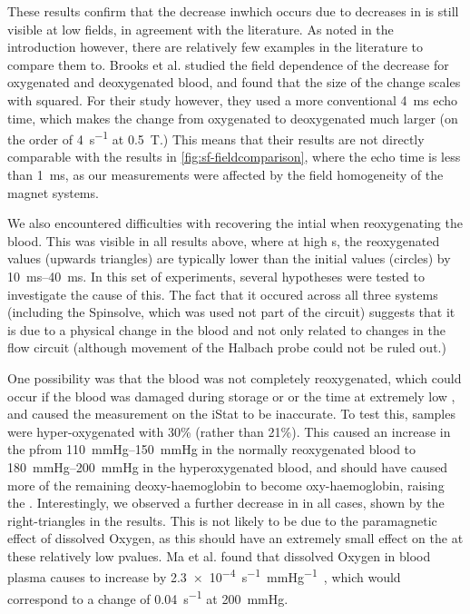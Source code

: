 These results confirm that the decrease in\Ttwo which occurs due to decreases in \SOtwo is still visible at low fields, in agreement with the literature.
As noted in the introduction however, there are relatively few examples in the literature to compare them to.
Brooks et al. studied the field dependence of the \Ttwo decrease for oxygenated and deoxygenated blood, and found that the size of the \Rtwo change scales with \Bzero  squared\cite[Fig.1]{BrooksComparisont2relaxation1995}.
For their study however, they used a more conventional \SI{4}{ms} echo time, which makes the \Rtwo change from oxygenated to deoxygenated much larger (on the order of \SI{4}{s^{-1}} at \SI{0.5}{T}.)
This means that their results are not directly comparable with the results in \autoref{fig:sf-fieldcomparison}, where the echo time is less than \SI{1}{ms}, as our measurements were affected by the field homogeneity of the magnet systems.

We also encountered difficulties with recovering the intial \Ttwo when reoxygenating the blood.
This was visible in all results above, where at high \SOtwo{}s, the reoxygenated \Ttwo values (upwards triangles)  are typically lower than the initial values (circles) by \SIrange{10}{40}{ms}.
In this set of experiments, several hypotheses were tested to investigate the cause of this.
The fact that it occured across all three systems (including the Spinsolve, which was used not part of the circuit) suggests that it is due to a physical change in the blood and not only related to changes in the flow circuit (although movement of the Halbach probe could not be ruled out.)

One possibility was that the blood was not completely reoxygenated, which could occur if the blood was damaged during storage or or the time at extremely low \SOtwo, and caused the \SOtwo measurement on the iStat to be inaccurate.
To test this, samples were hyper-oxygenated with 30\% \Otwo (rather than 21\%).
This caused an increase in the p\Otwo from \SIrange{110}{150}{mmHg} in the normally reoxygenated blood to \SIrange{180}{200}{mmHg} in the hyperoxygenated blood, and should have caused more of the remaining deoxy-haemoglobin to become oxy-haemoglobin, raising the \Ttwo.
Interestingly, we observed a further decrease in \Ttwo in all cases, shown by the right-triangles in the results.
This is not likely to be due to the paramagnetic effect of dissolved Oxygen, as this should have an extremely small effect on the \Ttwo at these relatively low p\Otwo values.
Ma et al. found that dissolved Oxygen in blood plasma causes \Rtwo to increase by \SI{2.3e-4}{s^{-1}\per\mmHg}~\cite{Maeffectdissolvedoxygen2016}, which would correspond to a change of \SI{0.04}{s^{-1}} at \SI{200}{mmHg}.

